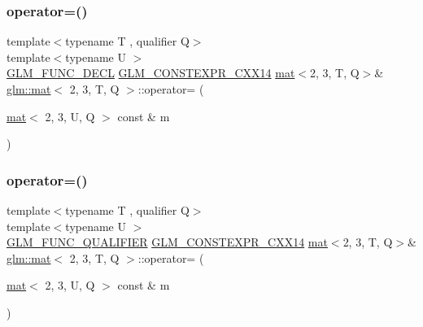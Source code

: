 \mbox{\label{structglm_1_1mat_3_012_00_013_00_01_t_00_01_q_01_4_a6081b3f971290a780c85fff4786366b0}} 
\subsubsection{\texorpdfstring{operator=()}{operator=()}\hspace{0.1cm}{\footnotesize\ttfamily [2/3]}}
{\footnotesize\ttfamily template$<$typename T , qualifier Q$>$ \\
template$<$typename U $>$ \\
\mbox{\hyperlink{setup_8hpp_ab2d052de21a70539923e9bcbf6e83a51}{G\+L\+M\+\_\+\+F\+U\+N\+C\+\_\+\+D\+E\+CL}} \mbox{\hyperlink{setup_8hpp_a4dd12abf5e1164bc57f3a34671d03844}{G\+L\+M\+\_\+\+C\+O\+N\+S\+T\+E\+X\+P\+R\+\_\+\+C\+X\+X14}} \mbox{\hyperlink{structglm_1_1mat}{mat}}$<$2, 3, T, Q$>$\& \mbox{\hyperlink{structglm_1_1mat}{glm\+::mat}}$<$ 2, 3, T, Q $>$\+::operator= (\begin{DoxyParamCaption}\item[{\mbox{\hyperlink{structglm_1_1mat}{mat}}$<$ 2, 3, U, Q $>$ const \&}]{m }\end{DoxyParamCaption})}

\mbox{\label{structglm_1_1mat_3_012_00_013_00_01_t_00_01_q_01_4_a6b5fd23ac7f9803d6b3a71d10b209bb4}} 
\subsubsection{\texorpdfstring{operator=()}{operator=()}\hspace{0.1cm}{\footnotesize\ttfamily [3/3]}}
{\footnotesize\ttfamily template$<$typename T , qualifier Q$>$ \\
template$<$typename U $>$ \\
\mbox{\hyperlink{setup_8hpp_a33fdea6f91c5f834105f7415e2a64407}{G\+L\+M\+\_\+\+F\+U\+N\+C\+\_\+\+Q\+U\+A\+L\+I\+F\+I\+ER}} \mbox{\hyperlink{setup_8hpp_a4dd12abf5e1164bc57f3a34671d03844}{G\+L\+M\+\_\+\+C\+O\+N\+S\+T\+E\+X\+P\+R\+\_\+\+C\+X\+X14}} \mbox{\hyperlink{structglm_1_1mat}{mat}}$<$2, 3, T, Q$>$\& \mbox{\hyperlink{structglm_1_1mat}{glm\+::mat}}$<$ 2, 3, T, Q $>$\+::operator= (\begin{DoxyParamCaption}\item[{\mbox{\hyperlink{structglm_1_1mat}{mat}}$<$ 2, 3, U, Q $>$ const \&}]{m }\end{DoxyParamCaption})}



